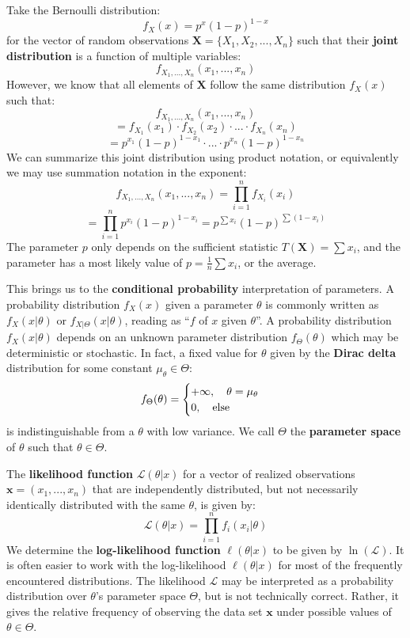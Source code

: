 \documentclass[10pt, a5paper, twoside, openright]{memoir}
\begin{document}
Take the Bernoulli distribution:
$$f_X(x) = p^x (1-p)^{1-x}$$
for the vector of random observations $\boldsymbol X = \{X_1, X_2,...,X_n\}$ such that their \textbf{joint distribution} is a function of multiple variables:
$$f_{X_1,...,X_n}(x_1,...,x_n)$$
However, we know that all elements of $\boldsymbol X$ follow the same distribution $f_X(x)$ such that:
$$f_{X_1,...,X_n}(x_1,...,x_n)$$
$$= f_{X_1}(x_1) \cdot f_{X_2}(x_2) \cdot ... \cdot f_{X_n}(x_n)$$
$$ = p^{x_1} (1-p)^{1-x_1} \cdot ... \cdot p^{x_n} (1-p)^{1-x_n} $$
We can summarize this joint distribution using product notation, or equivalently we may use summation notation in the exponent:
$$f_{X_1,...,X_n}(x_1,...,x_n) = \prod\limits_{i=1}^n f_{X_i}(x_i) $$
$$= \prod\limits_{i=1}^n p^{x_i} (1-p)^{1-x_i} = p^{\sum x_i} (1-p)^{\sum (1-x_i)}$$
The parameter $p$ only depends on the sufficient statistic $T(\boldsymbol X) = \sum x_i$, and the parameter has a most likely value of $p = \frac{1}{n} \sum x_i$, or the average.

This brings us to the \textbf{conditional probability} interpretation of parameters. A probability distribution $f_X(x)$ given a parameter $ \theta$ is commonly written as $f_X(x | \theta)$ or $f_{X | \Theta}(x | \theta)$, reading as ``$f$ of $x$ given $\theta$''. A probability distribution $f_X(x|\theta)$ depends on an unknown parameter distribution $f_\Theta(\theta)$ which may be deterministic or stochastic. In fact, a fixed value for $\theta$ given by the \textbf{Dirac delta} distribution  for some constant $\mu_\theta \in \Theta$:
$$f_\Theta(\theta) = \begin{cases} +\infty, \quad \theta = \mu_\theta \\ 0, \quad \textnormal{else}\end{cases}$$
is indistinguishable from a $\theta$ with low variance. We call $\Theta$ the \textbf{parameter space} of $\theta$ such that $\theta \in \Theta$.

The \textbf{likelihood function} $\mathcal L (\theta | x)$ for a vector of realized observations $\boldsymbol x = (x_1,...,x_n)$ that are independently distributed, but not necessarily identically distributed with the same $\theta$, is given by:
$$\mathcal L(\theta | x) = \prod\limits_{i=1}^n f_i(x_i |\theta)$$
We determine the \textbf{log-likelihood function} $\ell (\theta | x)$ to be given by $\ln(\mathcal L)$. It is often easier to work with the log-likelihood $\ell (\theta | x)$ for most of the frequently encountered distributions. The likelihood $\mathcal L$ may be interpreted as a probability distribution over $\theta$'s parameter space $\Theta$, but is not technically correct. Rather, it gives the relative frequency of observing the data set $\boldsymbol x$ under possible values of $\theta \in \Theta$.
\end{document}

